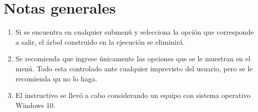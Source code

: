 \documentclass[letterpaper, 11pt]{article}
\begin{document}
	\newpage
	
	\section*{Notas generales}
	
	\begin{enumerate}
		\item Si se encuentra en cualquier submenú y selecciona la opción que corresponde a salir, el árbol construido en la ejecución se eliminirá.
		\item Se recomienda que ingrese únicamente las opciones que se le muestran en el menú. Todo esta controlado ante cualquier imprevisto del usuario, pero se le recomienda qu no lo haga.
		\item El instructivo se llevó a cabo considerando un equipo con sistema operativo Windows 10.
	\end{enumerate}
	
\end{document}
